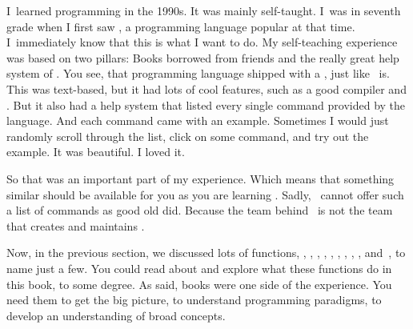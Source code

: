 %
\label{sec:pythonDocumentation}%
%
I~learned programming in the 1990s.
It was mainly self-taught.
I~was in seventh grade when I first saw , a programming language popular at that time.
I~immediately know that this is what I want to do.
My self-teaching experience was based on two pillars:
Books borrowed from friends and the really great help system of .
You see, that programming language shipped with a , just like \pycharm\ is.
This  was text-based, but it had lots of cool features, such as a good compiler and .
But it also had a help system that listed every single command provided by the language.
And each command came with an example.
Sometimes I would just randomly scroll through the list, click on some command, and try out the example.
It was beautiful.
I loved it.

So that was an important part of my experience.
Which means that something similar should be available for you as you are learning \python.
Sadly, \pycharm\ cannot offer such a list of commands as good old  did.
Because the team behind \pycharm\ is not the team that creates and maintains \python.

Now, in the previous section, we discussed lots of functions, , , , , , , , , , and~, to name just a few.
You could read about and explore what these functions do in this book, to some degree.
As said, books were one side of the experience.
You need them to get the big picture, to understand programming paradigms, to develop an understanding of broad concepts.


